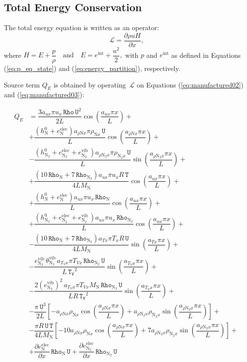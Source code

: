 \documentclass[10pt]{article}
\newcommand{\diff}[2] {\dfrac{\partial #1 }{\partial #2}}
\newcommand{\Lo}{\,\mathcal{L}}
\newcommand{\Rho}{\,\mathtt{Rho}}
\newcommand{\T}{\,\mathtt{T}}
\newcommand{\U}{\,\mathtt{U}}
\newcommand{\TV}{\,\mathtt{T_V}}
\newcommand{\N}{\text{N}}
\newcommand{\elec}{\text{elec}}
\newcommand{\vib}{\text{vib}}
\begin{document}
\subsection{Total Energy Conservation}
The total energy equation is written as an operator:
\begin{equation*}
 \label{eq:euler1d_14}
\Lo =\diff{\rho u H}{x} ,
\end{equation*}
where $H= E+ \dfrac{p}{\rho} \quad \mbox{and}\quad E=e^{\text{int}} + \dfrac{u^2 }{2} ,$ with $p$ and $e^{\text{int}}$ as defined in Equations (\ref{eq:p_eq_state}) and (\ref{eq:energy_partition}), respectively.

Source term $Q_E$ is obtained by operating $\Lo$ on Equations (\ref{eq:manufactured02}) and (\ref{eq:manufactured03}):

\begin{equation}
\begin{split}
Q_E &= \dfrac{3 a_{ux} \pi u_x \Rho \U^2 }{2L} \cos\left(\dfrac{a_{ux} \pi x}{L}\right) +\\ 
&+\dfrac{(h_{\N}^0+e_{\N}^{\elec}) a_{  \rho \N x } \pi \rho_{\N x} \U }{L} \cos\left(\dfrac{a_{  \rho \N x } \pi x}{L}\right) +\\ &-\dfrac{(h_{\N_2}^0+e_{\N_2}^{\elec}+e_{\N_2}^{\vib} \, ) a_{  \rho \N_2 x } \pi \rho_{\N_2 x} \U }{L} \sin\left(\dfrac{a_{  \rho \N_2 x } \pi x}{L}\right)  +\\ &+\dfrac{ (10 \Rho_{\N}+7 \Rho_{\N_2}) a_{ux} \pi u_x R \T  }{4L M_\N} \cos\left(\dfrac{a_{ux} \pi x}{L}\right)+\\ 
&+\dfrac{(h_{\N}^0+e_{\N}^{\elec}) a_{ux} \pi u_x \Rho_{\N}}{L} \cos\left(\dfrac{a_{ux} \pi x}{L}\right)  +\\ 
&+\dfrac{(h_{\N_2}^0+e_{\N_2}^{\elec}+e_{\N_2}^{\vib} \, ) a_{ux} \pi u_x \Rho_{\N_2} }{L}\cos\left(\dfrac{a_{ux} \pi x}{L}\right) +\\ 
&-\dfrac{ (10 \Rho_{\N}+7 \Rho_{\N_2}) a_{Tx} \pi T_x R \U }{4L M_\N}\sin\left(\dfrac{a_{Tx} \pi x}{L}\right)  +\\ 
&-\dfrac{e_{\N_2}^{\vib} \, \theta^{\vib}_{\N_2} \,   a_{T_V x} \pi T_{Vx} \Rho_{\N_2} \U }{L \TV^2}\sin\left(\dfrac{a_{T_V x} \pi x}{L}\right) +\\
&-\dfrac{2 (e_{\N_2}^{\vib})^2 \, a_{T_V x} \pi T_{Vx} M_\N \Rho_{\N_2} \U }{L R \TV^2}\sin\left(\dfrac{a_{T_V x} \pi x}{L}\right) +\\
&-\dfrac{ \pi \U^3 }{2L}\left[-a_{  \rho \N x } \rho_{\N x} \cos\left(\dfrac{a_{  \rho \N x } \pi x}{L}\right) +a_{  \rho \N_2 x } \rho_{\N_2 x} \sin\left(\dfrac{a_{  \rho \N_2 x } \pi x}{L}\right) \right]  +\\ 
&-\dfrac{\pi R \U \T}{4L M_\N} \left[-10 a_{  \rho \N x } \rho_{\N x} \cos\left(\dfrac{a_{  \rho \N x } \pi x}{L}\right) +7 a_{  \rho \N_2 x } \rho_{\N_2 x} \sin\left(\dfrac{a_{  \rho \N_2 x } \pi x}{L}\right) \right]  +\\ 
&+\diff{e_{\N}^{\elec}}{x} \Rho_{\N} \U+\diff{e_{\N_2}^{\elec}}{x} \Rho_{\N_2} \U
\end{split}
\end{equation}
\end{document}
